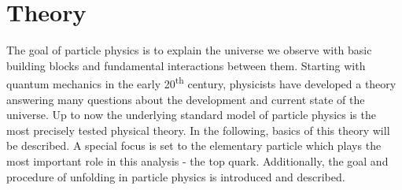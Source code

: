 \chapter{Theory}
\label{ch:Theo}
	The goal of particle physics is to explain the universe we observe with basic building blocks and fundamental interactions between them. Starting with quantum mechanics in the early 20\textsuperscript{th} century, physicists have developed a theory answering many questions about the development and current state of the universe. Up to now the underlying standard model of particle physics is the most precisely tested physical theory. In the following, basics of this theory will be described. A special focus is set to the elementary particle which plays the most important role in this analysis - the top quark. Additionally, the goal and procedure of unfolding in particle physics is introduced and described.
